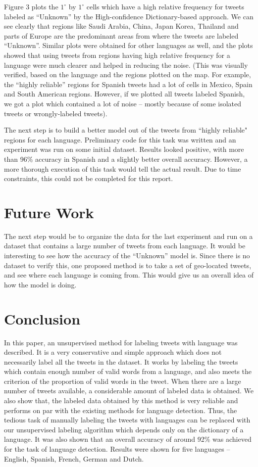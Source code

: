 \documentclass[11pt]{article}
\begin{document}
Figure 3 plots the $1^{\circ}$ by $1^{\circ}$ cells which have a high relative frequency for tweets labeled as ``Unknown'' by the High-confidence Dictionary-based approach. We can see clearly that regions like Saudi Arabia, China, Japan Korea, Thailand and parts of Europe are the predominant areas from where the tweets are labeled ``Unknown''. Similar plots were obtained for other languages as well, and the plots showed that using tweets from regions having high relative frequency for a language were much clearer and helped in reducing the noise. (This was visually verified, based on the language and the regions plotted on the map. For example, the ``highly reliable'' regions for Spanish tweets had a lot of cells in Mexico, Spain and South American regions. However, if we plotted all tweets labeled Spanish, we got a plot which contained a lot of noise -- mostly because of some isolated tweets or wrongly-labeled tweets).

The next step is to build a better model out of the tweets from ``highly reliable" regions for each language. Preliminary code for this task was written and an experiment was run on some initial dataset. Results looked positive, with more than 96\% accuracy in Spanish and a slightly better overall accuracy. However, a more thorough execution of this task would tell the actual result. Due to time constraints, this could not be completed for this report.

\section {Future Work}
The next step would be to organize the data for the last experiment and run on a dataset that contains a large number of tweets from each language. It would be interesting to see how the accuracy of the ``Unknown'' model is. Since there is no dataset to verify this, one proposed method is to take a set of geo-located tweets, and see where each language is coming from. This would give us an overall idea of how the model is doing.

\section{Conclusion}
In this paper, an unsupervised method for labeling tweets with language was described. It is a very conservative and simple approach which does not necessarily label all the tweets in the dataset. It works by labeling the tweets which contain enough number of valid words from a language, and also meets the criterion of the proportion of valid words in the tweet. When there are a large number of tweets available, a considerable amount of labeled data is obtained. We also show that, the labeled data obtained by this method is very reliable and performs on par with the existing methods for language detection. Thus, the tedious task of manually labeling the tweets with languages can be replaced with our unsupervised labeling algorithm which depends only on the dictionary of a language. It was also shown that an overall accuracy of around 92\% was achieved for the task of language detection. Results were shown for five languages -- English, Spanish, French, German and Dutch.
\end{document}
